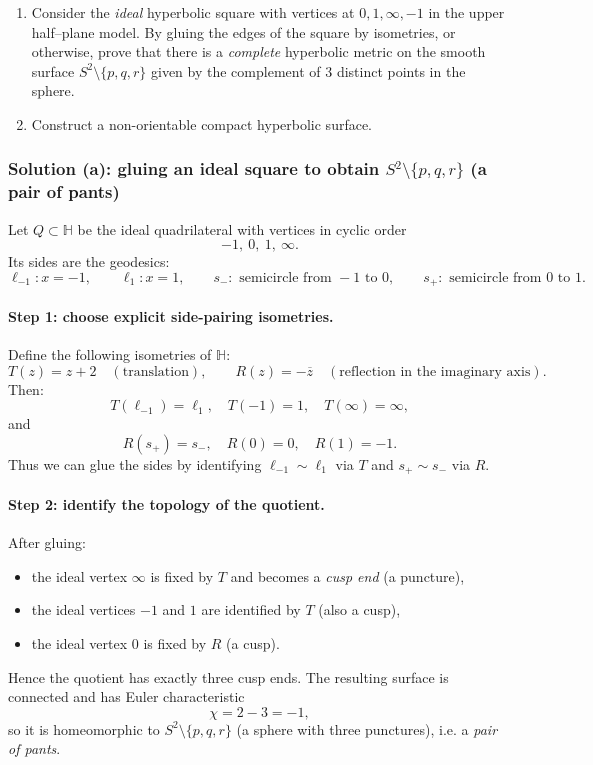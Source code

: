 \documentclass[12pt,a4paper]{article}
\newcommand{\HH}{\mathbb{H}}
\theoremstyle{plain}
\theoremstyle{definition}      %
\begin{document}
		\begin{enumerate}
			\item Consider the \emph{ideal} hyperbolic square with vertices at $0,1,\infty,-1$ in the upper half–plane model.
			By gluing the edges of the square by isometries, or otherwise, prove that there is a \emph{complete} hyperbolic metric
			on the smooth surface $S^2\setminus\{p,q,r\}$ given by the complement of $3$ distinct points in the sphere.
			\item Construct a non-orientable compact hyperbolic surface.
		\end{enumerate}

	
	\subsubsection*{Solution (a): gluing an ideal square to obtain $S^2\setminus\{p,q,r\}$ (a pair of pants)}
	Let $Q\subset\HH$ be the ideal quadrilateral with vertices in cyclic order
	\[
	-1,\ 0,\ 1,\ \infty.
	\]
	Its sides are the geodesics:
	\[
	\ell_{-1}: x=-1,\qquad
	\ell_{1}: x=1,\qquad
	s_-:\text{ semicircle from }-1\text{ to }0,\qquad
	s_+:\text{ semicircle from }0\text{ to }1.
	\]
	
	\paragraph{Step 1: choose explicit side-pairing isometries.}
	Define the following isometries of $\HH$:
	\[
	T(z)=z+2\quad(\text{translation}),\qquad
	R(z)=-\overline{z}\quad(\text{reflection in the imaginary axis}).
	\]
	Then:
	\[
	T(\ell_{-1})=\ell_1,\quad T(-1)=1,\quad T(\infty)=\infty,
	\]
	and
	\[
	R(s_+)=s_-,\quad R(0)=0,\quad R(1)=-1.
	\]
	Thus we can glue the sides by identifying $\ell_{-1}\sim\ell_1$ via $T$ and $s_+\sim s_-$ via $R$.
	
	\paragraph{Step 2: identify the topology of the quotient.}
	After gluing:
	\begin{itemize}
		\item the ideal vertex $\infty$ is fixed by $T$ and becomes a \emph{cusp end} (a puncture),
		\item the ideal vertices $-1$ and $1$ are identified by $T$ (also a cusp),
		\item the ideal vertex $0$ is fixed by $R$ (a cusp).
	\end{itemize}
	Hence the quotient has exactly three cusp ends. The resulting surface is connected and has Euler characteristic
	\[
	\chi = 2-3=-1,
	\]
	so it is homeomorphic to $S^2\setminus\{p,q,r\}$ (a sphere with three punctures), i.e. a \emph{pair of pants}.
	
\end{document}
